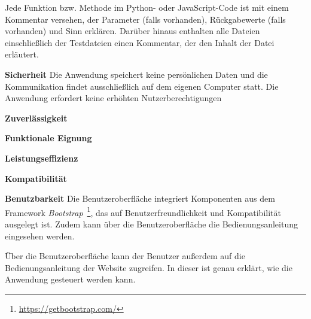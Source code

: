 Jede Funktion bzw. Methode im Python- oder JavaScript-Code ist mit einem Kommentar versehen, der Parameter (falls vorhanden), Rückgabewerte (falls vorhanden) und
Sinn erklären. Darüber hinaus enthalten alle Dateien einschließlich der Testdateien einen Kommentar, der den Inhalt der Datei erläutert.

\noindent\textbf{Sicherheit} Die Anwendung speichert keine persönlichen Daten und die Kommunikation findet ausschließlich auf dem eigenen Computer statt. Die Anwendung erfordert keine
erhöhten Nutzerberechtigungen  


\noindent\textbf{Zuverlässigkeit}


\noindent\textbf{Funktionale Eignung}


\noindent\textbf{Leistungseffizienz}


\noindent\textbf{Kompatibilität}


\noindent\textbf{Benutzbarkeit} Die Benutzeroberfläche integriert Komponenten aus dem Framework \textit{Bootstrap}~\footnote{\hspace{1.5mm}\url{https://getbootstrap.com/}}, das auf 
Benutzerfreundlichkeit und Kompatibilität ausgelegt ist. Zudem kann über die Benutzeroberfläche die Bedienungsanleitung eingesehen werden.

Über die Benutzeroberfläche kann der Benutzer außerdem auf die Bedienungsanleitung der Website zugreifen. In dieser ist genau erklärt, wie die Anwendung gesteuert werden kann. 
